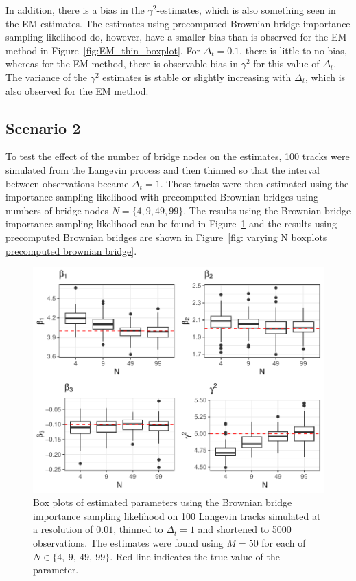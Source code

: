 In addition, there is a bias in the $\gamma^2$-estimates, which is also something seen in the EM estimates. The estimates using precomputed Brownian bridge importance sampling likelihood do, however, have a smaller bias than is observed for the EM method in Figure~\ref{fig:EM_thin_boxplot}. For $\Delta_t=0.1$, there is little to no bias, whereas for the EM method, there is observable bias in $\gamma^2$ for this value of $\Delta_t$. The variance of the $\gamma^2$ estimates is stable or slightly increasing with $\Delta_t$, which is also observed for the EM method.


\subsection{Scenario 2}
To test the effect of the number of bridge nodes on the estimates, 100 tracks were simulated from the Langevin process and then thinned so that the interval between observations became $\Delta_t =1$. These tracks were then estimated using the importance sampling likelihood with precomputed Brownian bridges using numbers of bridge nodes $N =\{4,9,49,99\}$. The results using the Brownian bridge importance sampling likelihood can be found in Figure~\ref{fig: varying N boxplots brownian bridge} and the results using precomputed Brownian bridges are shown in Figure~\ref{fig: varying N boxplots precomputed brownian bridge}. 

\begin{figure}[H]
    \centering
    \includegraphics[width=0.87\linewidth]{Images/Results/varying N estimates BB.pdf}
    \caption[Box plots of Parameter Estimates using Brownian bridge importance sampling using different number of bridge nodes]{Box plots of estimated parameters using the Brownian bridge importance sampling likelihood on 100 Langevin tracks simulated at a resolution of $0.01$, thinned to $\Delta_t = 1$ and shortened to 5000 observations. The estimates were found using $M=50$ for each of $N \in \{4 , \ 9, \ 49, \ 99\}$. Red line indicates the true value of the parameter.}
    \label{fig: varying N boxplots brownian bridge}
\end{figure}

